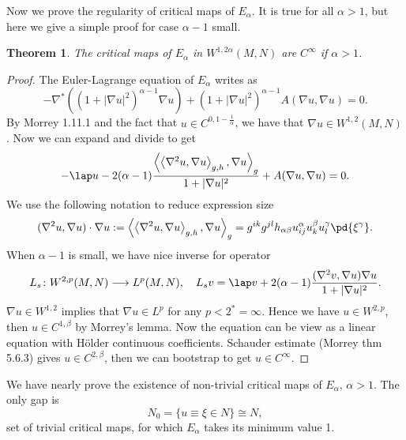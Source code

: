 \documentclass[UTF8,12pt]{article}
\theoremstyle{plain}\newtheorem{theorem}{Theorem}
\theoremstyle{definition}\newtheorem{definition}[theorem]{Definition}
\theoremstyle{definition}\newtheorem{example}[theorem]{Example}
\theoremstyle{plain}\newtheorem{axiom}[theorem]{Axiom}
\theoremstyle{plain}\newtheorem{assertion}[theorem]{Assertion}
\theoremstyle{plain}\newtheorem{corollary}[theorem]{Corollary}
\theoremstyle{plain}\newtheorem{lemma}[theorem]{Lemma}
\theoremstyle{plain}\newtheorem{proposition}[theorem]{Proposition}
\theoremstyle{plain}\newtheorem{prop}[theorem]{Proposition}
\theoremstyle{plain}\newtheorem{conjecture}[theorem]{Conjecture}
\theoremstyle{plain}\newtheorem{conj}[theorem]{Conjecture}
\theoremstyle{plain}\newtheorem{problem}[theorem]{Problem}
\theoremstyle{remark}\newtheorem{notation}[theorem]{Notation}
\theoremstyle{definition}\newtheorem*{question}{Question}
\theoremstyle{definition}\newtheorem*{answer}{Answer}
\theoremstyle{definition}\newtheorem*{goal}{Goal}
\theoremstyle{plain}\newtheorem*{application}{Application}
\theoremstyle{plain}\newtheorem*{exercise}{Exercise}
\theoremstyle{remark}\newtheorem*{remark}{Remark}
\theoremstyle{remark}\newtheorem*{note}{\small{Note}}
\numberwithin{equation}{section}
\numberwithin{theorem}{section}
\numberwithin{figure}{section}
\begin{document}
Now we prove the regularity of critical maps of \(E_\alpha\). It is true for all
\(\alpha>1\), but here we give a simple proof for case \(\alpha-1\) small.
\begin{theorem}\label{thm:regularity-alpha}
    The critical maps of \(E_\alpha\) in \(W^{1,2\alpha}(M,N)\) are \(C^\infty\) if
    \(\alpha>1\).
\end{theorem}
\begin{proof}
    The Euler-Lagrange equation of \(E_\alpha\) writes as \[
        -\nabla^*((1+|\nabla u|^2)^{\alpha-1}\nabla u)+(1+|\nabla u|^2)^{\alpha-1}
        A(\nabla u,\nabla u)=0
    .\] By Morrey 1.11.1 and the fact that \(u\in C^{0,1-\frac{1}{\alpha}}\), we
    have that \(\nabla u\in W^{1,2}(M,N)\). Now we can expand and divide to get
    \begin{equation}\label{eq:e-l-alpha}
        -\lap u-2(\alpha-1)\frac{\left<\left<\nabla^2 u,\nabla u\right>_{g,h},
        \nabla u\right>_g}{1+|\nabla u|^2}+A(\nabla u,\nabla u)=0
    .\end{equation}
    We use the following notation to reduce expression size \[
        (\nabla^2 u,\nabla u)\cdot\nabla u
        :=\left<\left<\nabla^2 u,\nabla u\right>_{g,h},\nabla u\right>_g
        =g^{ik}g^{jl}h_{\alpha\beta}u_{ij}^\alpha u_k^\beta u_l^\gamma \pd{\xi^\gamma}
    .\] When \(\alpha-1\) is small, we have nice inverse for operator \[
        L_s\colon W^{2,p}(M,N)\longrightarrow L^p(M,N),\quad
        L_s v=\lap v+2(\alpha-1) \frac{(\nabla^2 v,\nabla u)\nabla u}
        {1+|\nabla u|^2}
    .\] \(\nabla u\in W^{1,2}\) implies that \(\nabla u\in L^p\) for any
    \(p<2^*=\infty\). Hence we have \(u\in W^{2,p}\), then \(u\in C^{1,\beta}\)
    by Morrey's lemma. Now the equation can be view as a linear equation with H\"older
    continuous coefficients. Schauder estimate (Morrey thm 5.6.3) gives
    \(u\in C^{2,\beta}\), then we can bootstrap to get \(u\in C^\infty\).
\end{proof}
We have nearly prove the existence of non-trivial critical maps of \(E_\alpha\),
\(\alpha>1\). The only gap is \[
    N_0=\{u\equiv \xi\in N\}\cong N
,\] set of trivial critical maps, for which \(E_\alpha\) takes its minimum value 1.
\end{document}

